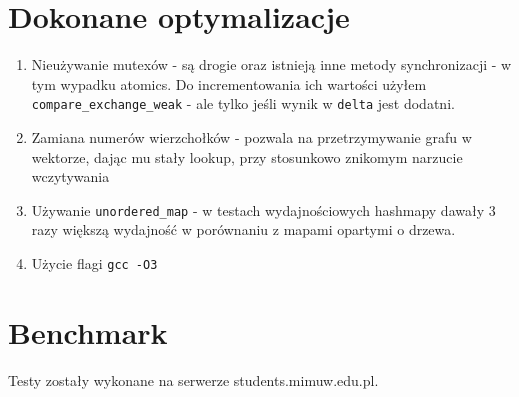 \documentclass{article}
\begin{document}

\section*{Dokonane optymalizacje}
\begin{enumerate}
\item Nieużywanie mutexów - są drogie oraz istnieją inne metody synchronizacji - w tym wypadku atomics. 
Do incrementowania ich wartości użyłem \verb|compare_exchange_weak| - ale tylko jeśli wynik w \verb+delta+ jest dodatni. 
\item Zamiana numerów wierzchołków - pozwala na przetrzymywanie grafu w wektorze, dając mu stały lookup, przy stosunkowo znikomym narzucie wczytywania
\item Używanie \verb|unordered_map| - w testach wydajnościowych hashmapy dawały 3 razy większą wydajność w porównaniu z mapami opartymi o drzewa.
\item Użycie flagi \verb|gcc -O3|
\end{enumerate}

\section*{Benchmark}
Testy zostały wykonane na serwerze students.mimuw.edu.pl.
\end{document}
